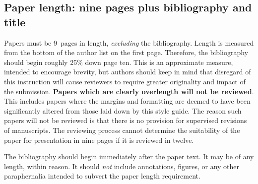 \documentclass{bmvc2k}
\begin{document}
\subsection{Paper length: nine pages plus bibliography and title}
Papers must be 9~pages in length, {\em excluding} the bibliography.  Length
is measured from the bottom of the author list on the first page.  Therefore, the
bibliography should begin roughly 25\% down page ten.  This is an
approximate measure, intended to encourage brevity, but authors should keep
in mind that disregard of this instruction will cause reviewers to
require greater originality and impact of the submission.  {\bf Papers which are
clearly overlength will not be reviewed}.  This includes papers where the
margins and formatting are deemed to have been significantly altered from
those laid down by this style guide.  The reason such papers will not be
reviewed is that there is no provision for supervised revisions of
manuscripts.  The reviewing process cannot determine the suitability of the
paper for presentation in nine pages if it is reviewed in twelve.

The bibliography should begin immediately after the paper text.  It may
be of any length, within reason.  It should {\em not} include
annotations, figures, or any other paraphernalia intended to subvert the
paper length requirement.
\end{document}
